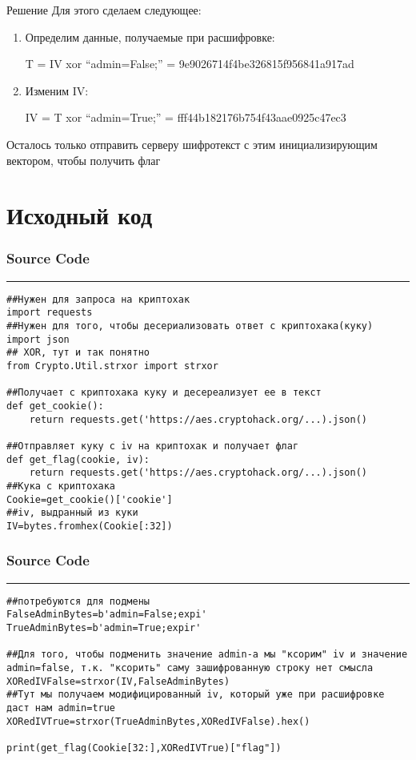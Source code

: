\documentclass[12pt]{beamer}
\begin{document}
\begin{frame}{Решение}
Для этого сделаем следующее:
  \begin{enumerate}
        \item Определим данные, получаемые при расшифровке:
        \par\footnotesize{T = IV xor “admin=False;” = 9e9026714f4be326815f956841a917ad}
        \item\normalsize{Изменим IV:}
        \par\footnotesize{IV = T xor “admin=True;” = fff44b182176b754f43aae0925c47ec3}
    \end{enumerate}
    Осталось только отправить серверу шифротекст с этим инициализирующим вектором, чтобы получить флаг
\end{frame}
\section{Исходный код}
\begin{frame}[fragile]
    \frametitle{Source Code}
    \rule{\textwidth}{1pt}
    \scriptsize
    \begin{verbatim}
##Нужен для запроса на криптохак
import requests
##Нужен для того, чтобы десериализовать ответ с криптохака(куку)
import json
## XOR, тут и так понятно
from Crypto.Util.strxor import strxor

##Получает с криптохака куку и десереализует ее в текст
def get_cookie():
	return requests.get('https://aes.cryptohack.org/...).json()

##Отправляет куку с iv на криптохак и получает флаг
def get_flag(cookie, iv):
	return requests.get('https://aes.cryptohack.org/...).json()
##Кука с криптохака
Cookie=get_cookie()['cookie']
##iv, выдранный из куки
IV=bytes.fromhex(Cookie[:32])
    \end{verbatim} 
\end{frame}
\begin{frame}[fragile]
    \frametitle{Source Code}
    \rule{\textwidth}{1pt}
    \scriptsize
    \begin{verbatim}
##потребуются для подмены
FalseAdminBytes=b'admin=False;expi'  
TrueAdminBytes=b'admin=True;expir'

##Для того, чтобы подменить значение admin-а мы "ксорим" iv и значение admin=false, т.к. "ксорить" саму зашифрованную строку нет смысла
XORedIVFalse=strxor(IV,FalseAdminBytes)
##Тут мы получаем модифицированный iv, который уже при расшифровке даст нам admin=true
XORedIVTrue=strxor(TrueAdminBytes,XORedIVFalse).hex()

print(get_flag(Cookie[32:],XORedIVTrue)["flag"])
    \end{verbatim}
\end{frame}
\end{document}
